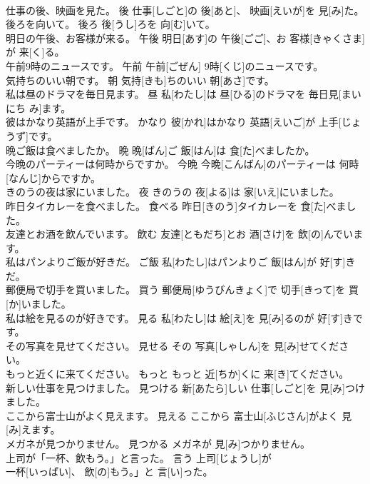 \documentclass[8pt]{extreport}
\begin{document}
\begin{CJK}{UTF8}{min}
\\	仕事の後、映画を見た。	後	仕事[しごと]の 後[あと]、 映画[えいが]を 見[み]た。	
\\	後ろを向いて。	後ろ	後[うし]ろを 向[む]いて。	
\\	明日の午後、お客様が来る。	午後	明日[あす]の 午後[ごご]、お 客様[きゃくさま]が 来[く]る。	
\\	午前9時のニュースです。	午前	午前[ごぜん] 9時[くじ]のニュースです。	
\\	気持ちのいい朝です。	朝	気持[きも]ちのいい 朝[あさ]です。	
\\	私は昼のドラマを毎日見ます。	昼	私[わたし]は 昼[ひる]のドラマを 毎日見[まいにち み]ます。	
\\	彼はかなり英語が上手です。	かなり	彼[かれ]はかなり 英語[えいご]が 上手[じょうず]です。	
\\	晩ご飯は食べましたか。	晩	晩[ばん]ご 飯[はん]は 食[た]べましたか。	
\\	今晩のパーティーは何時からですか。	今晩	今晩[こんばん]のパーティーは 何時[なんじ]からですか。	
\\	きのうの夜は家にいました。	夜	きのうの 夜[よる]は 家[いえ]にいました。	
\\	昨日タイカレーを食べました。	食べる	昨日[きのう]タイカレーを 食[た]べました。	
\\	友達とお酒を飲んでいます。	飲む	友達[ともだち]とお 酒[さけ]を 飲[の]んでいます。	
\\	私はパンよりご飯が好きだ。	ご飯	私[わたし]はパンよりご 飯[はん]が 好[す]きだ。	
\\	郵便局で切手を買いました。	買う	郵便局[ゆうびんきょく]で 切手[きって]を 買[か]いました。	
\\	私は絵を見るのが好きです。	見る	私[わたし]は 絵[え]を 見[み]るのが 好[す]きです。	
\\	その写真を見せてください。	見せる	その 写真[しゃしん]を 見[み]せてください。	
\\	もっと近くに来てください。	もっと	もっと 近[ちか]くに 来[き]てください。	
\\	新しい仕事を見つけました。	見つける	新[あたら]しい 仕事[しごと]を 見[み]つけました。	
\\	ここから富士山がよく見えます。	見える	ここから 富士山[ふじさん]がよく 見[み]えます。	
\\	メガネが見つかりません。	見つかる	メガネが 見[み]つかりません。	
\\	上司が「一杯、飲もう。」と言った。	言う	上司[じょうし]が
\\	一杯[いっぱい]、 飲[の]もう。」と 言[い]った。	

\end{CJK}
\end{document}
